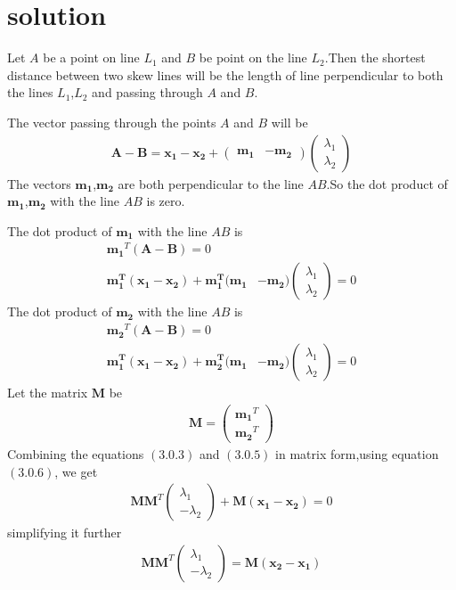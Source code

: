 \documentclass[journal,12pt,twocolumn]{IEEEtran}
\providecommand{\brak}[1]{\ensuremath{\left(#1\right)}}
\newcommand{\myvec}[1]{\ensuremath{\begin{pmatrix}#1\end{pmatrix}}}
\numberwithin{equation}{subsection}
\let\vec\mathbf
\begin{document}
\section{solution}
Let $A$ be a point on line $L_1$ and $B$ be point on the line $L_2$.Then the shortest distance between two skew lines will be the length of line perpendicular to both the lines $L_1$,$L_2$ and passing through $A$ and $B$.\par
The vector passing through the points $A$ and $B$ will be
\begin{align}
    \vec{A-B}=\vec{x_1-x_2}+\myvec{\vec{m_1} & -\vec{m_2}}\myvec{\lambda_1\\\lambda_2}
\end{align}
The vectors $\vec{m_1}$,$\vec{m_2}$ are both perpendicular to the line ${AB}$.So the dot product of $\vec{m_1}$,$\vec{m_2}$ with the line ${AB}$ is zero.\par
The dot product of $\vec{m_1}$ with the line ${AB}$ is
\begin{align}
    \vec{m_1}^T\brak{\vec{A-B}}=0\\
    \vec{m_1^T}(\vec{x_1-x_2})+\vec{m_1^T}(\vec{m_1} & -\vec{m_2})\begin{pmatrix}\lambda_1 \\ \lambda_2\end{pmatrix}=0
\end{align}
The dot product of $\vec{m_2}$ with the line ${AB}$ is
\begin{align}
    \vec{m_2}^T\brak{\vec{A-B}}=0\\
    \vec{m_1^T}(\vec{x_1-x_2})+\vec{m_2^T}(\vec{m_1} & -\vec{m_2})\myvec{\lambda_1 \\ \lambda_2}=0
\end{align}
Let the matrix $\vec{M}$ be
\begin{align}
    \vec{M}=\myvec{\vec{m_1}^T\\\vec{m_2}^T}
\end{align}
Combining the equations $(3.0.3)$ and $(3.0.5)$ in matrix form,using equation $(3.0.6)$, we get
\begin{align}
    \vec{M}\vec{M}^T\myvec{\lambda_1\\-\lambda_2}+\vec{M}\vec{(x_1-x_2)}=0
\end{align}
simplifying it further
\begin{align}
    \vec{M}\vec{M}^T\begin{pmatrix}\lambda_1\\-\lambda_2\end{pmatrix}=\vec{M}\vec{(x_2-x_1)}
\end{align}
\end{document}
